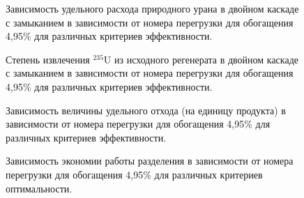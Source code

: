 \begin{figure}[ht]
    \centering
    \begin{minipage}{.5\textwidth}
      \centering
      
      \caption{{Зависимость удельного расхода природного урана в двойном каскаде с замыканием в зависимости от номера перегрузки для обогащения 4,95\% для различных критериев эффективности.{\label{3}}}}
    \end{minipage}%
    \begin{minipage}{.5\textwidth}
      \centering
      
\caption{{Степень извлечения $^{235}$U из исходного регенерата в двойном каскаде с замыканием в зависимости от номера перегрузки для обогащения 4,95\% для различных критериев эффективности.{\label{4}}}}
\end{minipage}
\end{figure}



\begin{figure}[ht]
    \centering
    \begin{minipage}{.5\textwidth}
      \centering
      
      \caption{{Зависимость величины удельного отхода (на единицу продукта) в зависимости от номера перегрузки для обогащения 4,95\% для различных критериев эффективности.{\label{5}}}}
    \end{minipage}%
    \begin{minipage}{.5\textwidth}
      \centering
      
\caption{{Зависимость экономии работы разделения в зависимости от номера перегрузки для обогащения 4,95\% для различных критериев оптимальности.{\label{6}}}}
\end{minipage}
\end{figure}


